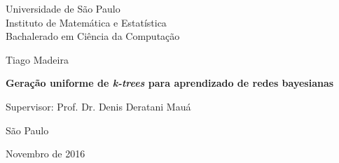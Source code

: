 \begin{center}
  \vspace*{1cm}
  Universidade de São Paulo\\
  Instituto de Matemática e Estatística\\
  Bachalerado em Ciência da Computação

  \vspace*{3cm}
  {\Large Tiago Madeira}

  \vspace{3cm}
  {
    \Large \bfseries
    Geração uniforme de \emph{k-trees} para aprendizado de redes bayesianas
  }

  \vspace{3cm}
  Supervisor: Prof. Dr. Denis Deratani Mauá

  \vspace{2cm}
  São Paulo

  Novembro de 2016
\end{center}
